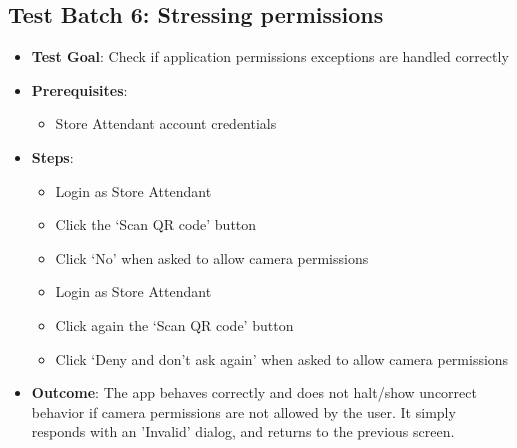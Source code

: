\subsection{Test Batch 6: Stressing permissions}
\begin{itemize}
    \item \textbf{Test Goal}: Check if application permissions exceptions are handled correctly
    \item \textbf{Prerequisites}:
          \begin{itemize}
              \item Store Attendant account credentials
          \end{itemize}
    \item \textbf{Steps}:
          \begin{itemize}
              \item Login as Store Attendant
              \item Click the `Scan QR code' button
              \item Click `No' when asked to allow camera permissions
              \item Login as Store Attendant
              \item Click again the `Scan QR code' button
              \item Click `Deny and don't ask again' when asked to allow camera permissions
          \end{itemize}
    \item \textbf{Outcome}:  The app behaves correctly and does not halt/show uncorrect behavior if camera permissions are not allowed by the user. It simply responds with an 'Invalid' dialog, and returns to the previous screen.
\end{itemize}
